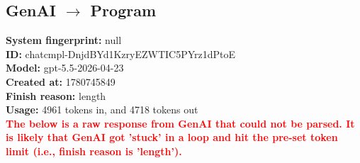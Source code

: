 \documentclass{article}
\begin{document}
\subsection*{GenAI $\rightarrow$ Program}
\textbf{System fingerprint: }null
\\\textbf{ID: }chatcmpl-DnjdBYd1KzryEZWTIC5PYrz1dPtoE
\\\textbf{Model: }gpt-5.5-2026-04-23
\\\textbf{Created at: }1780745849
\\\textbf{Finish reason: }length
\\\textbf{Usage: }4961 tokens in, and 4718 tokens out
\\\textcolor{red}{\textbf{The below is a raw response from GenAI that could not be parsed. It is likely that GenAI got 'stuck' in a loop and hit the pre-set token limit (i.e., finish reason is 'length').}}
\begin{lstlisting}

\end{lstlisting}
\end{document}
